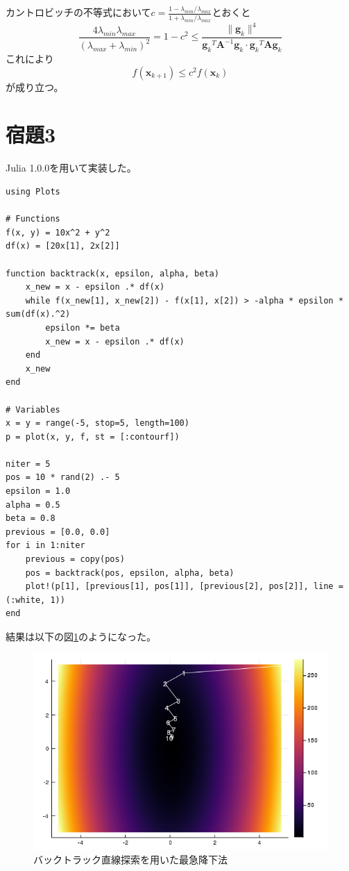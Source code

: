 \documentclass[10pt,a4paper]{ltjsarticle}       %
\begin{document}
    カントロビッチの不等式において$c = \frac{1 - \lambda_{min} / \lambda_{max}}{1 + \lambda_{min} / \lambda_{max}}$とおくと
    \begin{equation}
      \frac{
        4\lambda_{min}\lambda_{max}
      }{
        \left( \lambda_{max} + \lambda_{min} \right)^2
      } = 1 - c^2 \le \frac{
        \|\bm{g}_k \|^4
      }{
        {\bm{g}_k}^T \bm{A}^{-1} \bm{g}_k \cdot {\bm{g}_k}^T \bm{A} \bm{g}_k
      }
    \end{equation}
    これにより
    \begin{equation}
    f(\bm{x}_{k+1}) \le c^2 f(\bm{x}_k)
    \end{equation}
    が成り立つ。
    \section{宿題3}
    Julia 1.0.0を用いて実装した。
    \begin{lstlisting}
using Plots

# Functions
f(x, y) = 10x^2 + y^2
df(x) = [20x[1], 2x[2]]

function backtrack(x, epsilon, alpha, beta)
    x_new = x - epsilon .* df(x)
    while f(x_new[1], x_new[2]) - f(x[1], x[2]) > -alpha * epsilon * sum(df(x).^2)
        epsilon *= beta
        x_new = x - epsilon .* df(x)
    end
    x_new
end

# Variables
x = y = range(-5, stop=5, length=100)
p = plot(x, y, f, st = [:contourf])

niter = 5
pos = 10 * rand(2) .- 5
epsilon = 1.0
alpha = 0.5
beta = 0.8
previous = [0.0, 0.0]
for i in 1:niter
    previous = copy(pos)
    pos = backtrack(pos, epsilon, alpha, beta)
    plot!(p[1], [previous[1], pos[1]], [previous[2], pos[2]], line = (:white, 1))
end
    \end{lstlisting}
    結果は以下の図\ref{fig:optim}のようになった。
    \begin{figure}[htbp]
      \begin{center}
        \includegraphics[clip, scale=0.7]{optim.png}
        \caption{バックトラック直線探索を用いた最急降下法}
        \label{fig:optim}
      \end{center}
    \end{figure}
\end{document}
